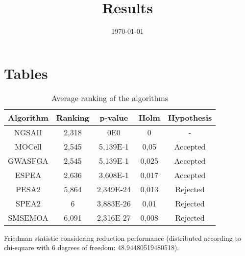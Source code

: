 \documentclass{article}
\title{Results}
\author{}
\date{\today}
\begin{document}
\oddsidemargin 0in \topmargin 0in\maketitle

\section{Tables}
\begin{table}[!htp]
\centering
\begin{tabular}{c|c|c|c|c}
Algorithm&Ranking&p-value&Holm&Hypothesis\\
\hline
NGSAII & 2,318 & 0E0 & 0 & -\\
MOCell & 2,545 & 5,139E-1 & 0,05 & Accepted\\
GWASFGA & 2,545 & 5,139E-1 & 0,025 & Accepted\\
ESPEA & 2,636 & 3,608E-1 & 0,017 & Accepted\\
PESA2 & 5,864 & 2,349E-24 & 0,013 & Rejected\\
SPEA2 & 6 & 3,883E-26 & 0,01 & Rejected\\
SMSEMOA & 6,091 & 2,316E-27 & 0,008 & Rejected\\
\end{tabular}
\caption{Average ranking of the algorithms}
\end{table}


Friedman statistic considering reduction performance (distributed according to chi-square with 6 degrees of freedom: 48.94480519480518).
\end{document}
